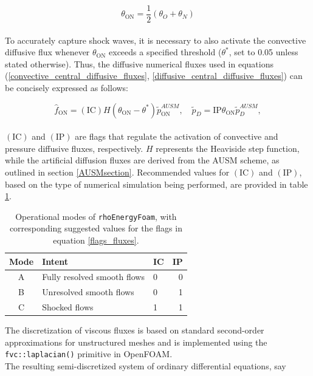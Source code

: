 \documentclass[a5paper]{sapthesis}
\begin{document}
	\begin{equation}
		\theta_{\text{ON}} = \frac{1}{2} (\theta_O +\theta_N)
	\end{equation}
	\\
	To accurately capture shock waves, it is necessary to also activate the convective diffusive flux whenever $ \theta_{\text{ON}} $ exceeds a specified threshold ($ \theta^* $, set to 0.05 unless stated otherwise). Thus, the diffusive numerical fluxes used in equations (\ref{convective_central_diffusive_fluxes}, \ref{diffusive_central_diffusive_fluxes}) can be concisely expressed as follows:
	
	\begin{equation}
		\hat{f}_{\text{ON}} = (\text{IC}) H (\theta_{\text{ON}} - \theta^*) \tilde{p}_{\text{ON}}^{AUSM}, \quad
		\tilde{p}_D = \text{IP} \theta_{\text{ON}} \tilde{p}_D^{AUSM},
		\label{flags_fluxes}
	\end{equation}
	\\
	$(\text{IC})$ and $(\text{IP})$ are flags that regulate the activation of convective and pressure diffusive fluxes, respectively. $H$ represents the Heaviside step function, while the artificial diffusion fluxes are derived from the AUSM scheme, as outlined in section \ref{AUSMsection}. Recommended values for $(\text{IC})$ and $(\text{IP})$, based on the type of numerical simulation being performed, are provided in table \ref{REF_modes}.  
	
	\begin{table}[h]
		\centering
		\renewcommand{\arraystretch}{1.4} %
		\begin{tabular}{c l l r}
			\hline
			\textbf{Mode} & \textbf{Intent} & \textbf{IC} & \textbf{IP} \\
			\hline
			A & Fully resolved smooth flows & 0 & 0 \\
			B & Unresolved smooth flows & 0 & 1 \\
			C & Shocked flows & 1 & 1 \\
			\hline
		\end{tabular}
				\vspace{3mm}
		\caption{Operational modes of \texttt{rhoEnergyFoam}, with corresponding	suggested values for the flags in equation \ref{flags_fluxes}.}
		\label{REF_modes}
	\end{table}
	\noindent The discretization of viscous fluxes is based on standard second-order approximations for unstructured meshes \cite{hirsch2007numerical} and is implemented using the \texttt{fvc::laplacian()} primitive in OpenFOAM.
	\\The resulting semi-discretized system of ordinary differential equations, say 
	
\end{document}
